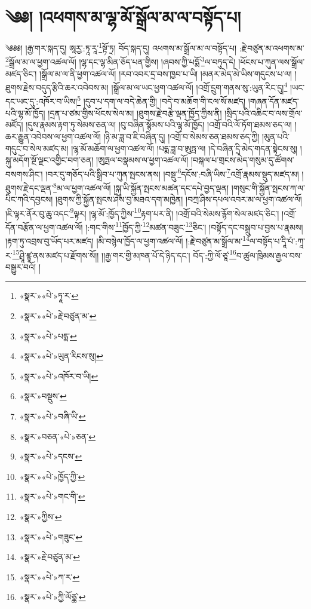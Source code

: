 \chapter{༄༅། །འཕགས་མ་ལྷ་མོ་སྒྲོལ་མ་ལ་བསྟོད་པ།}༄༅༅། །རྒྱ་གར་སྐད་དུ། ཨཱརྱ་:ཏཱ་རཱ་\footnote{«སྣར་»«པེ་»ཏཱ་ར་}སྟོ་ཏྲ། བོད་སྐད་དུ། འཕགས་མ་སྒྲོལ་མ་ལ་བསྟོད་པ། :རྗེ་བཙུན་མ་འཕགས་མ་\footnote{«སྣར་»«པེ་»རྗེ་བཙུན་མ་}སྒྲོལ་མ་ལ་ཕྱག་འཚལ་ལོ། །ལྷ་དང་ལྷ་མིན་ཅོད་པན་གྱིས། །ཞབས་ཀྱི་པདྨོ་\footnote{«སྣར་»«པེ་»པདྨ་}ལ་བཏུད་དེ། །ཕོངས་པ་ཀུན་ལས་སྒྲོལ་མཛད་ཅིང་། །སྒྲོལ་མ་ལ་ནི་ཕྱག་འཚལ་ལོ། །རབ་འབར་དྲ་བས་ཁྱབ་པ་ཡི། །མནར་མེད་མེ་ཡིས་གདུངས་པ་ལ། །ཐུགས་རྗེས་བདུད་རྩིའི་ཆར་འབེབས་མ། །སྒྲོལ་མ་ལ་ཡང་ཕྱག་འཚལ་ལོ། །འགྲོ་དྲུག་གནས་སུ་:ཡུན་རིང་དུ།\footnote{«སྣར་»«པེ་»ཡུན་རིངས་སུ།} །ཡང་དང་ཡང་དུ་:འཁོར་བ་ཡིས།\footnote{«སྣར་»«པེ་»འཁོར་བ་ཡི།} །དུབ་པ་དག་ལ་བདེ་ཆེན་གྱི། །བདེ་བ་མཆོག་གི་ངལ་སོ་མཛད། །གཞན་དོན་མཛད་པའི་ལྷ་མོ་ཁྱོད། །དྲན་པ་ཙམ་གྱིས་ཕོངས་སེལ་མ། །ཐུགས་རྗེ་བརྩེ་ལྡན་ཁྱོད་ཀྱིས་ནི། །སྲིད་པའི་འཆིང་བ་ལས་གྲོལ་མཛོད། །དུས་རྣམས་རྟག་ཏུ་སེམས་ཅན་ལ། །བུ་བཞིན་སྙོམས་པའི་ལྷ་མོ་ཁྱོད། །འགྲོ་བའི་ལོ་ཏོག་ཐམས་ཅད་ལ། །ཆར་རྒྱུན་འབེབས་ལ་ཕྱག་འཚལ་ལོ། །ཉི་མ་ཟླ་བ་ཇི་བཞིན་དུ། །འགྲོ་བ་སེམས་ཅན་ཐམས་ཅད་ཀྱི། །མུན་པའི་གདུང་བ་སེལ་མཛད་མ། །ལྷ་མོ་མཆོག་ལ་ཕྱག་འཚལ་ལོ། །པདྨ་ཟླ་བ་ཨུཏྤ་ལ། །དེ་བཞིན་དྲི་མེད་གདན་སྟེངས་སུ། །སྐུ་མདོག་སྔོ་ལྗང་འགྱིང་བག་ཅན། །ཨུཏྤལ་བསྣམས་ལ་ཕྱག་འཚལ་ལོ། །བསྐལ་པ་གྲངས་མེད་གསུམ་དུ་ཚོགས་བསགས་ཤིང་། །བར་དུ་གཅོད་པའི་སྒྲིབ་པ་ཀུན་སྤངས་ནས། །བསྡུ་\footnote{«སྣར་»བསྡུས་}དངོས་:བཞི་ཡིས་\footnote{«སྣར་»«པེ་»བཞི་ཡི་}འགྲོ་རྣམས་སྡུད་མཛད་མ། །ཐུགས་རྗེ་དང་ལྡན་\footnote{«སྣར་»བཅན་«པེ་»ཅན་}མ་ལ་ཕྱག་འཚལ་ལོ། །སྐུ་ཡི་སྐྱོན་སྤངས་མཚན་དང་དཔེ་བྱད་ལྡན། །གསུང་གི་སྐྱོན་སྤངས་ཀ་ལ་པིང་ཀའི་དབྱངས། །ཐུགས་ཀྱི་སྐྱོན་སྤངས་ཤེས་བྱ་མཐའ་དག་མཁྱེན། །བཀྲ་ཤིས་དཔལ་འབར་མ་ལ་ཕྱག་འཚལ་ལོ། །ཇི་ལྟར་ནོར་བུ་ཆུ་འདང་\footnote{«སྣར་»«པེ་»དངས་}ལྟར། །ལྷ་མོ་:ཁྱོད་ཀྱིས་\footnote{«སྣར་»«པེ་»ཁྱོད་ཀྱི་}རྟག་པར་ནི། །འགྲོ་བའི་སེམས་རྙོག་སེལ་མཛད་ཅིང་། །འགྲོ་དོན་བརྩོན་ལ་ཕྱག་འཚལ་ལོ། །:གང་གིས་\footnote{«སྣར་»«པེ་»གང་གི་}ཁྱོད་ཀྱི་\footnote{«སྣར་»ཀྱིས་}མཚན་བཟུང་\footnote{«སྣར་»«པེ་»གཟུང་}ཅིང་། །བསྟོད་དང་བསྒྲུབ་པ་བྱས་པ་རྣམས། །རྟག་ཏུ་འབྲས་བུ་ཡོད་པར་མཛད། །མི་བསྙེལ་ཁྱོད་ལ་ཕྱག་འཚལ་ལོ། །:རྗེ་བཙུན་མ་སྒྲོལ་མ་\footnote{«སྣར་»རྗེ་བཙུན་མ་}ལ་བསྟོད་པ་དཱི་པཾ་:ཀཱ་ར་\footnote{«སྣར་»«པེ་»ཀ་ར་}ཤྲཱི་ཛྙཱ་ནས་མཛད་པ་རྫོགས་སོ།། །།རྒྱ་གར་གྱི་མཁན་པོ་དེ་ཉིད་དང་། བོད་:ཀྱི་ལོ་ཙཱ་\footnote{«སྣར་»«པེ་»ཀྱི་ལོཙྪ་}བ་ཚུལ་ཁྲིམས་རྒྱལ་བས་བསྒྱུར་བའོ། ། 